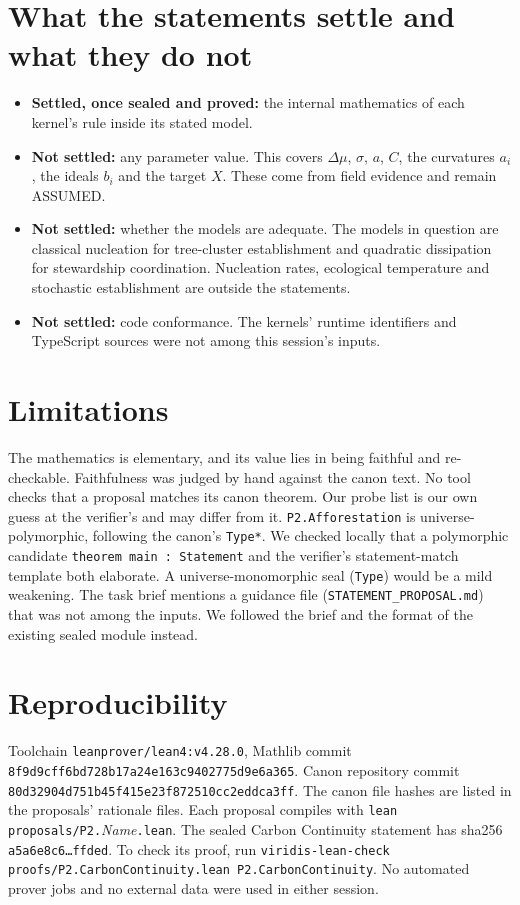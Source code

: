 \documentclass[11pt]{article}
\theoremstyle{definition}
\theoremstyle{remark}
\begin{document}
\section{What the statements settle and what they do not}
\begin{itemize}
\item \textbf{Settled, once sealed and proved:} the internal mathematics of each kernel's rule inside its stated model.
\item \textbf{Not settled:} any parameter value. This covers $\Delta\mu$, $\sigma$, $a$, $C$, the curvatures $a_i$, the ideals $b_i$ and the target $X$.
These come from field evidence and remain ASSUMED.
\item \textbf{Not settled:} whether the models are adequate. The models in question are classical nucleation for tree-cluster establishment and
quadratic dissipation for stewardship coordination. Nucleation rates, ecological temperature and stochastic establishment are outside the statements.
\item \textbf{Not settled:} code conformance. The kernels' runtime identifiers and TypeScript sources were not among this session's inputs.
\end{itemize}

\section{Limitations}
The mathematics is elementary, and its value lies in being faithful and re-checkable.
Faithfulness was judged by hand against the canon text. No tool checks that a proposal matches its canon theorem.
Our probe list is our own guess at the verifier's and may differ from it.
\texttt{P2.Afforestation} is universe-polymorphic, following the canon's \texttt{Type*}. We checked locally that a polymorphic
candidate \texttt{theorem main : Statement} and the verifier's statement-match template both elaborate.
A universe-monomorphic seal (\texttt{Type}) would be a mild weakening.
The task brief mentions a guidance file (\texttt{STATEMENT\_PROPOSAL.md}) that was not among the inputs.
We followed the brief and the format of the existing sealed module instead.

\section{Reproducibility}
Toolchain \texttt{leanprover/lean4:v4.28.0}, Mathlib commit \texttt{8f9d9cff6bd728b17a24e163c9402775d9e6a365}.
Canon repository commit \texttt{80d32904d751b45f415e23f872510cc2eddca3ff}. The canon file hashes are listed in the proposals' rationale files.
Each proposal compiles with \texttt{lean proposals/P2.}\textit{Name}\texttt{.lean}.
The sealed Carbon Continuity statement has sha256 \texttt{a5a6e8c6\ldots ffded}. To check its proof, run
\texttt{viridis-lean-check proofs/P2.CarbonContinuity.lean P2.CarbonContinuity}.
No automated prover jobs and no external data were used in either session.
\end{document}
